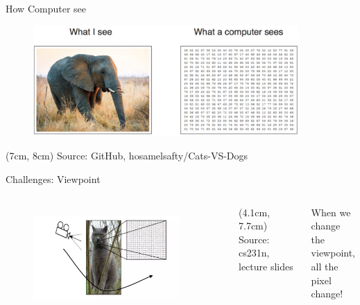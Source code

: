\documentclass[citestyle=authoryear,bibstyle=numeric,hyperref,backend=biber]{sdqbeamer}
\begin{document}
\begin{frame}{How Computer see}
    \begin{figure}
        \centering
        \includegraphics[width=0.9\textwidth]{pictures/what_computer_sees.png}
        \label{fig:what_computer_sees}
    \end{figure} 
        \begin{textblock*}{6cm}(7cm, 8cm) %
             \tiny{Source: GitHub, hosamelsafty/Cats-VS-Dogs}
        \end{textblock*}
\end{frame}

\begin{frame}{Challenges: Viewpoint}
    \begin{columns}
        \begin{figure}
            \centering
            \includegraphics[width=0.9\textwidth]{pictures/viewpoint_variation.png}
            \label{fig:viewpoint_variation}
        \end{figure}
        \begin{textblock*}{6cm}(4.1cm, 7.7cm) %
             \tiny{Source: cs231n, lecture slides}
        \end{textblock*}
        
        When we change the viewpoint, \\ all the pixel change!
    \end{columns}
\end{frame}
\end{document}
